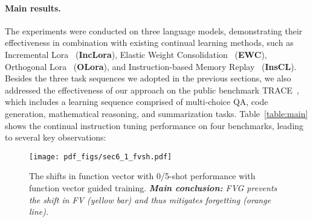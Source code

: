 


\paragraph{Main results.} 
The experiments were conducted on three language models, demonstrating their effectiveness in combination with existing continual learning methods, such as Incremental Lora~\cite{hu2021lora} (\textbf{IncLora}), Elastic Weight Consolidation~\cite{Kirkpatrick_2017} (\textbf{EWC}), Orthogonal Lora~\cite{wang2023orthogonal} (\textbf{OLora}), and Instruction-based Memory Replay~\cite{wang2024inscl} (\textbf{InsCL}).
Besides the three task sequences we adopted in the previous sections, we also addressed the effectiveness of our approach on the public benchmark TRACE~\cite{wang2023trace}, which includes a learning sequence comprised of multi-choice QA, code generation, mathematical reasoning, and summarization tasks. Table~\ref{table:main} shows the continual instruction tuning performance on four benchmarks, leading to several key observations:

\begin{wrapfigure}{hr}{0.53\textwidth}
  \centering
  \vspace{-1.8em}
  \texttt{[image: pdf\_figs/sec6\_1\_fvsh.pdf]}
  \vspace{-2.5em}
  \caption{The shifts in function vector with 0/5-shot performance with function vector guided training. {\textit{\textbf{Main conclusion:} FVG prevents the shift in FV (yellow bar) and thus mitigates forgetting (orange line).}}} 
  \label{fig:sec6:fvshit}
  \vspace{-1.0em}
\end{wrapfigure}


